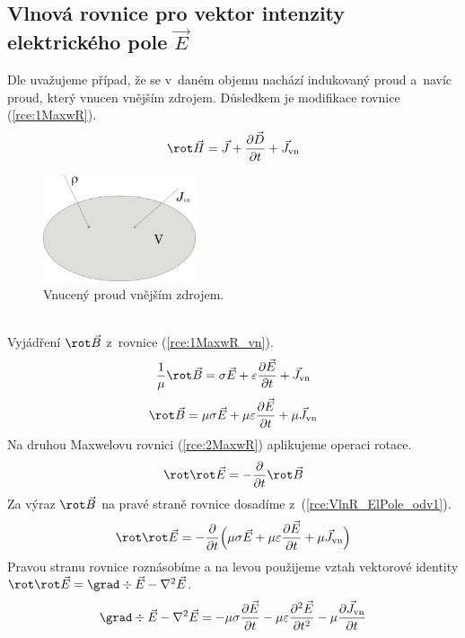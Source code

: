 \subsection{Vlnová rovnice pro vektor intenzity elektrického pole $\vec E$}
Dle \cite[str. 33]{emp} uvažujeme případ, že se v~daném objemu nachází indukovaný proud a~navíc proud, který vnucen vnějším zdrojem. Důsledkem je modifikace rovnice (\ref{rce:1MaxwR}).
\begin{equation}
	\rot\vec H = \vec J+\frac{\partial\vec D}{\partial t}+\vec J_{\mathrm{vn}}
	\label{rce:1MaxwR_vn}
\end{equation}
\begin{figure}[!h]
	\centering
	\includegraphics[width=4.5cm]{vnuceny_I.png}
	\caption{Vnucený proud vnějším zdrojem.}
	\label{obr:vnuceny_I}
\end{figure}\\
Vyjádření $\rot\vec B$ z~rovnice (\ref{rce:1MaxwR_vn}).
\begin{displaymath}
	\frac{1}{\mu} \rot\vec B = \sigma \vec E+\varepsilon\frac{\partial\vec E}{\partial t}+\vec J_{\mathrm{vn}}
\end{displaymath}
\begin{equation}
	\rot\vec B = \mu\sigma\vec E+\mu\varepsilon\frac{\partial\vec E}{\partial t}+\mu\vec J_{\mathrm{vn}}
	\label{rce:VlnR_ElPole_odv1}
\end{equation}
Na druhou Maxwelovu rovnici (\ref{rce:2MaxwR}) aplikujeme operaci rotace.
\begin{displaymath}
	\rot\rot\vec E = -\frac{\partial}{\partial t}\rot\vec B
\end{displaymath}
Za výraz $\rot\vec B$ na pravé straně rovnice dosadíme z~(\ref{rce:VlnR_ElPole_odv1}).
\begin{displaymath}
	\rot\rot\vec E = -\frac{\partial}{\partial t}\Big(\mu\sigma\vec E+\mu\varepsilon\frac{\partial\vec E}{\partial t}+\mu\vec J_{\mathrm{vn}}\Big)
\end{displaymath}
Pravou stranu rovnice roznásobíme a na levou použijeme vztah vektorové identity $\rot\rot\vec E = \grad\div\vec E - \nabla^{2}\vec E$. 
\begin{displaymath}
	\grad\div\vec E - \nabla^{2}\vec E = -\mu\sigma\frac{\partial\vec E}{\partial t}-\mu\varepsilon\frac{\partial^{2}\vec E}{\partial t^{2}}-\mu\frac{\partial\vec J_{\mathrm{vn}}}{\partial t}
\end{displaymath}

